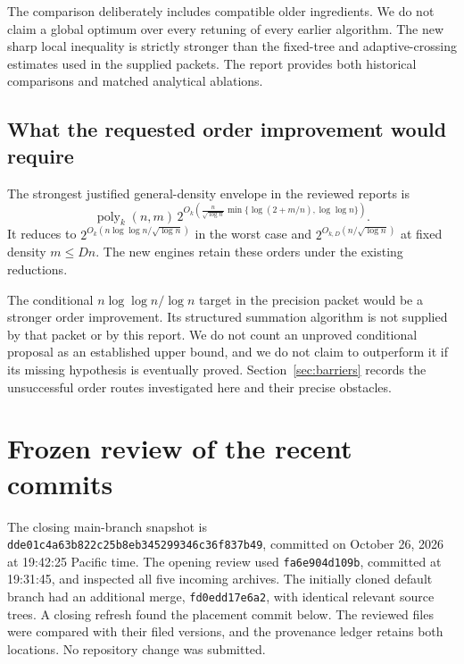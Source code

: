 \documentclass[11pt,letterpaper]{article}
\theoremstyle{remark}\newtheorem{remark}[theorem]{Remark}
\newcommand{\poly}{\operatorname{poly}}
\newcommand{\pin}{\texttt{dde01c4a63b822c25b8eb345299346c36f837b49}}
\begin{document}
The comparison deliberately includes compatible older ingredients. We do
not claim a global optimum over every retuning of every earlier algorithm.
The new sharp local inequality is strictly stronger than the fixed-tree
and adaptive-crossing estimates used in the supplied packets. The report
provides both historical comparisons and matched analytical ablations.

\subsection{What the requested order improvement would require}

The strongest justified general-density envelope in the reviewed reports is
\begin{equation}\label{eq:sat-envelope}
 \poly_k(n,m)\,
 2^{O_k\!\left(\frac{n}{\sqrt{\log n}}
     \min\{\log(2+m/n),\log\log n\}\right)}.
\end{equation}
It reduces to $2^{O_k(n\log\log n/\sqrt{\log n})}$ in the worst case and
$2^{O_{k,D}(n/\sqrt{\log n})}$ at fixed density $m\le Dn$.
The new engines retain these orders under the existing reductions.

The conditional $n\log\log n/\log n$ target in the precision packet
\cite{precision} would be a stronger order improvement. Its structured
summation algorithm is not supplied by that packet or by this report.
We do not count an unproved conditional proposal as an established upper
bound, and we do not claim to outperform it if its missing hypothesis is
eventually proved. Section~\ref{sec:barriers} records the unsuccessful order
routes investigated here and their precise obstacles.

\section{Frozen review of the recent commits}
\label{sec:review}

The closing main-branch snapshot is \pin, committed on October 26,
2026 at 19:42:25 Pacific time. The opening review used
\texttt{fa6e904d109b}, committed at 19:31:45, and inspected all five incoming
archives. The initially cloned default branch had an additional merge,
\texttt{fd0edd17e6a2}, with identical relevant source trees. A closing
refresh found the placement commit below. The reviewed files were compared
with their filed versions, and the provenance ledger retains both locations.
No repository change was submitted.
\end{document}
